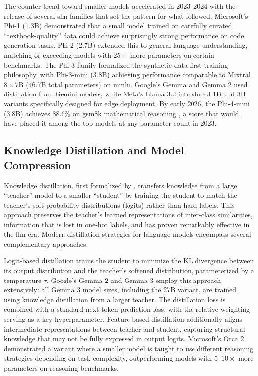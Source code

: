 The counter-trend toward smaller models accelerated in 2023--2024 with the release of several \gls{slm} families that set the pattern for what followed. Microsoft's Phi-1 (1.3B) \citep{gunasekar2023phi1} demonstrated that a small model trained on carefully curated ``textbook-quality'' data could achieve surprisingly strong performance on code generation tasks. Phi-2 (2.7B) \citep{microsoft2023phi2} extended this to general language understanding, matching or exceeding models with $25\times$ more parameters on certain benchmarks. The Phi-3 family \citep{abdin2024phi3} formalized the synthetic-data-first training philosophy, with Phi-3-mini (3.8B) achieving performance comparable to Mixtral $8\times7$B (46.7B total parameters) on \gls{mmlu}. Google's Gemma \citep{gemma2024} and Gemma 2 \citep{gemma2team2024} used distillation from Gemini models, while Meta's Llama 3.2 \citep{grattafiori2024llama3} introduced 1B and 3B variants specifically designed for edge deployment. By early 2026, the Phi-4-mini (3.8B) achieves 88.6\% on \gls{gsm8k} mathematical reasoning \citep{microsoft2025phi4mini}, a score that would have placed it among the top models at any parameter count in 2023.


\subsection{Knowledge Distillation and Model Compression}
\label{subsec:background_distillation}
Knowledge distillation, first formalized by \citet{hinton2015distilling}, transfers knowledge from a large ``teacher'' model to a smaller ``student'' by training the student to match the teacher's soft probability distributions (logits) rather than hard labels. This approach preserves the teacher's learned representations of inter-class similarities, information that is lost in one-hot labels, and has proven remarkably effective in the \gls{llm} era. Modern distillation strategies for language models encompass several complementary approaches.

Logit-based distillation trains the student to minimize the KL divergence between its output distribution and the teacher's softened distribution, parameterized by a temperature $\tau$. Google's Gemma 2 \citep{gemma2team2024} and Gemma 3 \citep{team2025gemma3} employ this approach extensively: all Gemma 3 model sizes, including the 27B variant, are trained using knowledge distillation from a larger teacher. The distillation loss is combined with a standard next-token prediction loss, with the relative weighting serving as a key hyperparameter. Feature-based distillation \citep{romero2015fitnets} additionally aligns intermediate representations between teacher and student, capturing structural knowledge that may not be fully expressed in output logits. Microsoft's Orca 2 \citep{mitra2023orca2} demonstrated a variant where a smaller model is taught to use different reasoning strategies depending on task complexity, outperforming models with 5--$10\times$ more parameters on reasoning benchmarks.

